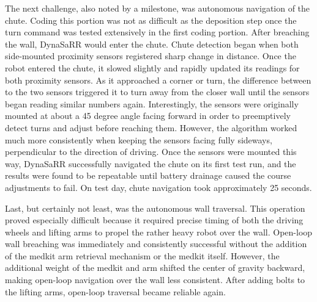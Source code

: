 The next challenge, also noted by a milestone, was autonomous navigation of the chute. Coding this portion was not as difficult as the deposition step once the turn command was tested extensively in the first coding portion. After breaching the wall, DynaSaRR would enter the chute. Chute detection began when both side-mounted proximity sensors registered sharp change in distance. Once the robot entered the chute, it slowed slightly and rapidly updated its readings for both proximity sensors. As it approached a corner or turn, the difference between to the two sensors triggered it to turn away from the closer wall until the sensors began reading similar numbers again. Interestingly, the sensors were originally mounted at about a 45 degree angle facing forward in order to preemptively detect turns and adjust before reaching them. However, the algorithm worked much more consistently when keeping the sensors facing fully sideways, perpendicular to the direction of driving. Once the sensors were mounted this way, DynaSaRR successfully navigated the chute on its first test run, and the results were found to be repeatable until battery drainage caused the course adjustments to fail. On test day, chute navigation took approximately 25 seconds. 

Last, but certainly not least, was the autonomous wall traversal. This operation proved especially difficult because it required precise timing of both the driving wheels and lifting arms to propel the rather heavy robot over the wall. Open-loop wall breaching was immediately and consistently successful without the addition of the medkit arm retrieval mechanism or the medkit itself. However, the additional weight of the medkit and arm shifted the center of gravity backward, making open-loop navigation over the wall less consistent. After adding bolts to the lifting arms, open-loop traversal became reliable again. 

